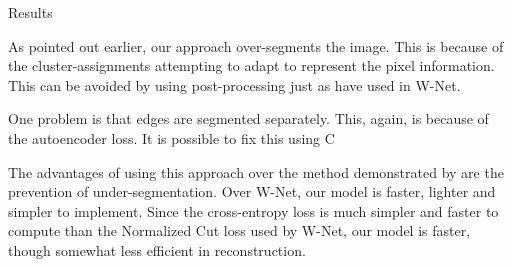 \documentclass{article}
\begin{document}
\begin{ssection}{Results}
	\vspace{5mm}


	As pointed out earlier, our approach over-segments the image. This is because of the cluster-assignments attempting to adapt to represent the pixel information. This can be avoided by using post-processing just as \cite{wnet} have used in W-Net.

	One problem is that edges are segmented separately. This, again, is because of the autoencoder loss. It is possible to fix this using C

	The advantages of using this approach over the method demonstrated by \cite{backprop} are the prevention of under-segmentation. Over W-Net, our model is faster, lighter and simpler to implement. Since the cross-entropy loss is much simpler and faster to compute than the Normalized Cut loss used by W-Net, our model is faster, though somewhat less efficient in reconstruction.

\end{ssection}



\end{document}
